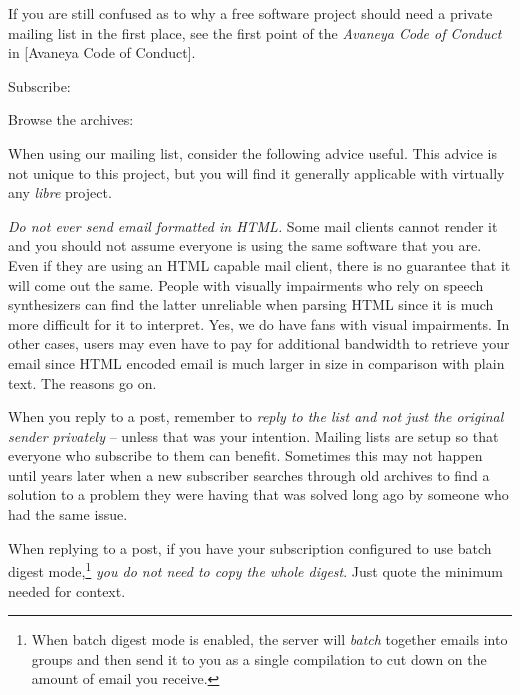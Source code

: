 If you are still confused as to why a free software project should need a private mailing list in the first place, see the first point of the {\it Avaneya Code of Conduct} in [Avaneya Code of Conduct].

\blank[2*big]
\startnarrower[3*left]
Subscribe:\crlf
{} 

\blank[2*big]
Browse the archives:\crlf
{}
\stopnarrower

When using our mailing list, consider the following advice useful. This advice is not unique to this project, but you will find it generally applicable with virtually any {\it libre} project.

\startitemize[4]
\item
{\it Do not ever send email formatted in HTML.} Some mail clients cannot render it and you should not assume everyone is using the same software that you are. Even if they are using an HTML capable mail client, there is no guarantee that it will come out the same. People with visually impairments who rely on speech synthesizers can find the latter unreliable when parsing HTML since it is much more difficult for it to interpret. Yes, we do have fans with visual impairments. In other cases, users may even have to pay for additional bandwidth to retrieve your email since HTML encoded email is much larger in size in comparison with plain text. The reasons go on.

\item
When you reply to a post, remember to {\it reply to the list and not just the original sender privately} -- unless that was your intention. Mailing lists are setup so that everyone who subscribe to them can benefit. Sometimes this may not happen until years later when a new subscriber searches through old archives to find a solution to a problem they were having that was solved long ago by someone who had the same issue.

\item
When replying to a post, if you have your subscription configured to use batch digest mode,\footnote{When batch digest mode is enabled, the server will {\it batch} together emails into groups and then send it to you as a single compilation to cut down on the amount of email you receive.} {\it you do not need to copy the whole digest}. Just quote the minimum needed for context.

